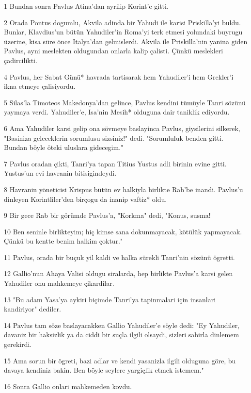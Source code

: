 \par 1 Bundan sonra Pavlus Atina'dan ayrilip Korint'e gitti.
\par 2 Orada Pontus dogumlu, Akvila adinda bir Yahudi ile karisi Priskilla'yi buldu. Bunlar, Klavdius'un bütün Yahudiler'in Roma'yi terk etmesi yolundaki buyrugu üzerine, kisa süre önce Italya'dan gelmislerdi. Akvila ile Priskilla'nin yanina giden Pavlus, ayni meslekten oldugundan onlarla kalip çalisti. Çünkü meslekleri çadircilikti.
\par 4 Pavlus, her Sabat Günü* havrada tartisarak hem Yahudiler'i hem Grekler'i ikna etmeye çalisiyordu.
\par 5 Silas'la Timoteos Makedonya'dan gelince, Pavlus kendini tümüyle Tanri sözünü yaymaya verdi. Yahudiler'e, Isa'nin Mesih* olduguna dair taniklik ediyordu.
\par 6 Ama Yahudiler karsi gelip ona sövmeye baslayinca Pavlus, giysilerini silkerek, "Basiniza geleceklerin sorumlusu sizsiniz!" dedi. "Sorumluluk benden gitti. Bundan böyle öteki uluslara gidecegim."
\par 7 Pavlus oradan çikti, Tanri'ya tapan Titius Yustus adli birinin evine gitti. Yustus'un evi havranin bitisigindeydi.
\par 8 Havranin yöneticisi Krispus bütün ev halkiyla birlikte Rab'be inandi. Pavlus'u dinleyen Korintliler'den birçogu da inanip vaftiz* oldu.
\par 9 Bir gece Rab bir görümde Pavlus'a, "Korkma" dedi, "Konus, susma!
\par 10 Ben seninle birlikteyim; hiç kimse sana dokunmayacak, kötülük yapmayacak. Çünkü bu kentte benim halkim çoktur."
\par 11 Pavlus, orada bir buçuk yil kaldi ve halka sürekli Tanri'nin sözünü ögretti.
\par 12 Gallio'nun Ahaya Valisi oldugu siralarda, hep birlikte Pavlus'a karsi gelen Yahudiler onu mahkemeye çikardilar.
\par 13 "Bu adam Yasa'ya aykiri biçimde Tanri'ya tapinmalari için insanlari kandiriyor" dediler.
\par 14 Pavlus tam söze baslayacakken Gallio Yahudiler'e söyle dedi: "Ey Yahudiler, davaniz bir haksizlik ya da ciddi bir suçla ilgili olsaydi, sizleri sabirla dinlemem gerekirdi.
\par 15 Ama sorun bir ögreti, bazi adlar ve kendi yasanizla ilgili olduguna göre, bu davaya kendiniz bakin. Ben böyle seylere yargiçlik etmek istemem."
\par 16 Sonra Gallio onlari mahkemeden kovdu.
